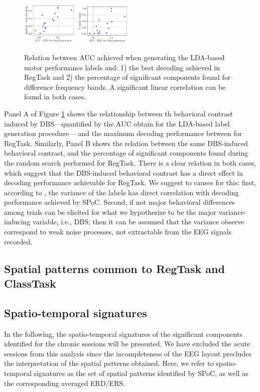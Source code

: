 \documentclass[10pt,a4paper, twocolumn]{article}
\newcommand{\regtask}{RegTask\xspace}
\newcommand{\classtask}{ClassTask\xspace}
\begin{document}
\begin{figure}
\includegraphics[width=0.24\textwidth]{figures/auclda_vs_bestdec}
\includegraphics[width=0.24\textwidth]{figures/auclda_vs_ncomp}
\caption{Relation between AUC achieved when generating the LDA-based motor performance labels and: 1) the best decoding achieved in \regtask and 2) the percentage of significant components found for difference frequency bands. A significant linear correlation can be found in both cases.}
\label{fig:auclda_perf}
\end{figure}

Panel A of Figure \ref{fig:auclda_perf} shows the relationship between th behavioral contrast induced by DBS---quantified by the AUC obtain for the LDA-based label generation procedure--- and the maximum decoding performance between for \regtask. Similarly, Panel B shows the relation between the same DBS-induced behavioral contrast, and the percentage of significant components found during the random search performed for \regtask. There is a clear relation in both cases, which suggest that the DBS-induced behavioral contrast has a direct effect in decoding performance achievable for \regtask. We suggest to causes for this: first, according to \cite{AndreasComponentsStroked}, the variance of the labels has direct correlation with decoding performance achieved by SPoC. Second, if not major behavioral differences among trials can be elicited for what we hypothesize to be the major variance-inducing variable, i.e., DBS; then it can be assumed that the variance observe correspond to weak noise processes, not extractable from the EEG signals recorded.

\subsection{Spatial patterns common to \regtask and \classtask}

\subsection{Spatio-temporal signatures}
In the following, the spatio-temporal signatures of the significant components identified for the chronic sessions will be presented. We have excluded the acute sessions from this analysis since the incompleteness of the EEG layout precludes the interpretation of the spatial patterns obtained. Here, we refer to spatio-temporal signatures as the set of spatial patterns identified by SPoC, as well as the corresponding averaged ERD/ERS.
\end{document}
